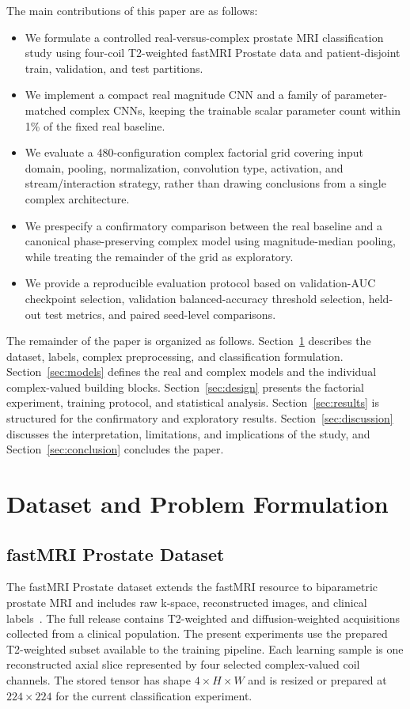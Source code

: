\documentclass[journal]{IEEEtran}
\begin{document}
The main contributions of this paper are as follows:
\begin{itemize}
    \item We formulate a controlled real-versus-complex prostate MRI classification study using four-coil T2-weighted fastMRI Prostate data and patient-disjoint train, validation, and test partitions.
    \item We implement a compact real magnitude CNN and a family of parameter-matched complex CNNs, keeping the trainable scalar parameter count within 1\% of the fixed real baseline.
    \item We evaluate a 480-configuration complex factorial grid covering input domain, pooling, normalization, convolution type, activation, and stream/interaction strategy, rather than drawing conclusions from a single complex architecture.
    \item We prespecify a confirmatory comparison between the real baseline and a canonical phase-preserving complex model using magnitude-median pooling, while treating the remainder of the grid as exploratory.
    \item We provide a reproducible evaluation protocol based on validation-AUC checkpoint selection, validation balanced-accuracy threshold selection, held-out test metrics, and paired seed-level comparisons.
\end{itemize}

The remainder of the paper is organized as follows. Section~\ref{sec:data} describes the dataset, labels, complex preprocessing, and classification formulation. Section~\ref{sec:models} defines the real and complex models and the individual complex-valued building blocks. Section~\ref{sec:design} presents the factorial experiment, training protocol, and statistical analysis. Section~\ref{sec:results} is structured for the confirmatory and exploratory results. Section~\ref{sec:discussion} discusses the interpretation, limitations, and implications of the study, and Section~\ref{sec:conclusion} concludes the paper.

\section{Dataset and Problem Formulation}\label{sec:data}
\subsection{fastMRI Prostate Dataset}
The fastMRI Prostate dataset extends the fastMRI resource to biparametric prostate MRI and includes raw k-space, reconstructed images, and clinical labels~\cite{Tibrewala2024FastMRIProstate}. The full release contains T2-weighted and diffusion-weighted acquisitions collected from a clinical population. The present experiments use the prepared T2-weighted subset available to the training pipeline. Each learning sample is one reconstructed axial slice represented by four selected complex-valued coil channels. The stored tensor has shape $4\times H\times W$ and is resized or prepared at $224\times224$ for the current classification experiment.
\end{document}
